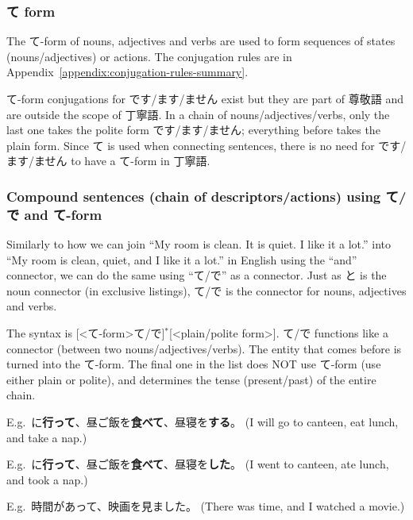 \documentclass[../nihongo-gakushuu-kyouzai.tex]{subfiles}
\begin{document}
\subsubsection{て form} \label{sec:te-form}

The て-form of nouns, adjectives and verbs are used to form sequences of states (nouns/adjectives) or actions. The conjugation rules are in Appendix~\ref{appendix:conjugation-rules-summary}.

て-form conjugations for です/ます/ません exist but they are part of 尊敬語 and are outside the scope of 丁寧語. In a chain of nouns/adjectives/verbs, only the last one takes the polite form です/ます/ません; everything before takes the plain form. Since て is used when connecting sentences, there is no need for です/ます/ません to have a て-form in 丁寧語.

\subsubsection{Compound sentences (chain of descriptors/actions) using て/で and て-form}
Similarly to how we can join ``My room is clean. It is quiet. I like it a lot.'' into ``My room is clean, quiet, and I like it a lot.'' in English using the ``and'' connector, we can do the same using ``て/で'' as a connector. Just as と is the noun connector (in exclusive listings), て/で is the connector for nouns, adjectives and verbs.

The syntax is [<て-form>て/で]$^*$[<plain/polite form>]. て/で functions like a connector (between two nouns/adjectives/verbs). The entity that comes before is turned into the て-form. The final one in the list does NOT use て-form (use either plain or polite), and determines the tense (present/past) of the entire chain.

E.g.\ に\textbf{行って}、昼ご飯を\textbf{食べて}、昼寝を\textbf{する}。 (I will go to canteen, eat lunch, and take a nap.)

E.g.\ に\textbf{行って}、昼ご飯を\textbf{食べて}、昼寝を\textbf{した}。 (I went to canteen, ate lunch, and took a nap.)

E.g.\ 時間があって、映画を見ました。 (There was time, and I watched a movie.)
\end{document}
